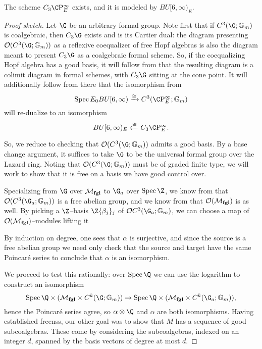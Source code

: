 \begin{theorem}
The scheme $C_3 \CP^\infty_E$ exists, and it is modeled by $BU[6, \infty)_E$.
\end{theorem}
\begin{proof}[Proof sketch]
Let $\G$ be an arbitrary formal group.  Note first that if $C^3(\G; \Gm)$ is coalgebraic, then $C_3 \G$ exists and is its Cartier dual: the diagram presenting $\sheaf O(C^3(\G; \Gm))$ as a reflexive coequalizer of free Hopf algebras is also the diagram meant to present $C_3 \G$ as a coalgebraic formal scheme.  So, if the coequalizing Hopf algebra has a good basis, it will follow from  that the resulting diagram is a colimit diagram in formal schemes, with $C_3 \G$ sitting at the cone point.  It will additionally follow from there that the isomorphism from  \[\Spec E_0 BU[6, \infty) \xrightarrow{\cong} C^3(\CP^\infty_E; \Gm)\] will re-dualize to an isomorphism \[BU[6, \infty)_E \xleftarrow{\cong} C_3 \CP^\infty_E.\]

So, we reduce to checking that $\sheaf O(C^3(\G; \Gm))$ admits a good basis.  By a base change argument, it suffices to take $\G$ to be the universal formal group over the Lazard ring.  Noting that $\sheaf O(C^3(\G; \Gm))$ must be of graded finite type, we will work to show that it is free on a basis we have good control over.

Specializing from $\G$ over $\mathcal{M}_{\mathbf{fgl}}$ to $\G_a$ over $\Spec \Z$, we know from  that $\sheaf O(C^3(\G_a; \Gm))$ is a free abelian group, and we know from  that $\mathcal{O}(\mathcal{M}_{\mathbf{fgl}})$ is as well.  By picking a $\Z$--basis $\Z\{\beta_j\}_j$ of $\sheaf O C^3(\G_a; \Gm)$, we can choose a map of $\mathcal{O}(\mathcal{M}_{\mathbf{fgl}})$--modules lifting it
\begin{center}
\end{center}
By induction on degree, one sees that $\alpha$ is surjective, and since the source is a free abelian group we need only check that the source and target have the same Poincar\'e series to conclude that $\alpha$ is an isomorphism.

We proceed to test this rationally: over $\Spec \Q$ we can use the logarithm to construct an isomorphism \[\Spec \Q \times (\moduli{fgl} \times C^k(\G; \Gm)) \to \Spec \Q \times (\moduli{fgl} \times C^k(\G_a; \Gm)),\] hence the Poincar\'e series agree, so $\alpha \otimes \Q$ and $\alpha$ are both isomorphisms.  Having established freenss, our other goal was to show that $M$ has a sequence of good subcoalgebras.  These come by considering the subcoalgebras, indexed on an integer $d$, spanned by the basis vectors of degree at most $d$.
\end{proof}


